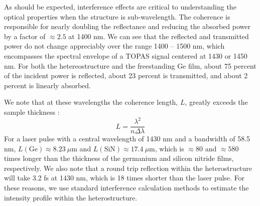 As should be expected, interference effects are critical to understanding the optical properties when the structure is sub-wavelength. The coherence is responsible for nearly doubling the reflectance and reducing the absorbed power by a factor of $\approx 2.5$ at 1400 nm.  We can see that the reflected and transmitted power do not change appreciably over the range {1400 -- 1500 nm}, which encompasses the spectral envelope of a TOPAS signal centered at 1430 or 1450 nm. For both the hetereostructure and the freestanding Ge film, about 75 percent of the incident power is reflected, about 23 percent is transmitted, and about 2 percent is linearly absorbed.

We note that at these wavelengths the coherence length, $L$, greatly exceeds the sample thickness \cite{katsidisGeneralTransfermatrixMethod2002}:
\begin{equation}
L = \frac{\lambda^2}{n \Delta \lambda}
\end{equation}
For a laser pulse with a central wavelength of 1430 nm and a bandwidth of 58.5 nm, $L(\textrm{Ge}) \approx 8.23 \ \mu\textrm{m}$ and $L(\textrm{SiN}) \approx 17.4 \ \mu\textrm{m}$, which is $\approx 80$ and $\approx 580$ times longer than the thickness of the germanium and silicon nitride films, respectively. We also note that a round trip reflection within the heterostructure will take 3.2 fs at 1430 nm, which is 18 times shorter than the laser pulse. For these reasons, we use standard interference calculation methods to estimate the intensity profile within the heterostructure.

